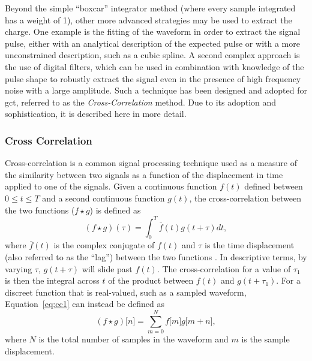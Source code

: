 Beyond the simple ``boxcar'' integrator method (where every sample integrated has a weight of 1), other more advanced strategies may be used to extract the charge. One example is the fitting of the waveform in order to extract the signal pulse, either with an analytical description of the expected pulse or with a more unconstrained description, such as a cubic spline. A second complex approach is the use of digital filters, which can be used in combination with knowledge of the pulse shape to robustly extract the signal even in the presence of high frequency noise with a large amplitude. Such a technique has been designed and adopted for \gls{gct}, referred to as the \textit{Cross-Correlation} method. Due to its adoption and sophistication, it is described here in more detail. 

\subsubsection{Cross Correlation} \label{section:crosscorrelation}

Cross-correlation is a common signal processing technique used as a measure of the similarity between two signals as a function of the displacement in time applied to one of the signals. Given a continuous function $f(t)$ defined between $0 \le t \le T$ and a second continuous function $g(t)$, the cross-correlation between the two functions ($f \star g$) is defined as 
\begin{equation} \label{eq:cc1}
(f \star g)(\tau) = \int_0^T \overline{f}(t)g(t + \tau)dt,
\end{equation}
where $\overline{f}(t)$ is the complex conjugate of $f(t)$ and $\tau$ is the time displacement (also referred to as the ``lag'') between the two functions \cite{wolfram-crosscorrelate}. In descriptive terms, by varying $\tau$, $g(t + \tau)$ will slide past $f(t)$. The cross-correlation for a value of $\tau_1$ is then the integral across $t$ of the product between $f(t)$ and $g(t + \tau_1)$. For a discreet function that is real-valued, such as a sampled waveform, Equation~\ref{eq:cc1} can instead be defined as
\begin{equation} \label{eq:cc2}
(f \star g)\lbrack n \rbrack = \sum_{m=0}^N f\lbrack m \rbrack g\lbrack m + n\rbrack,
\end{equation}
where $N$ is the total number of samples in the waveform and $m$ is the sample displacement. 

